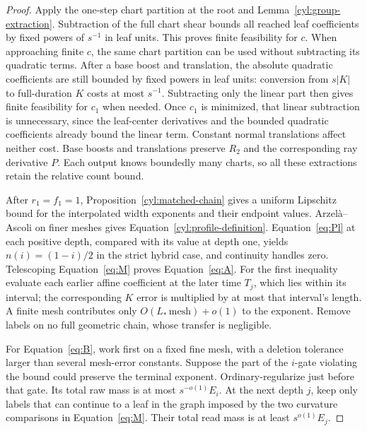 \begin{proof}
Apply the one-step chart partition at the root and
Lemma~\ref{cyl:group-extraction}.  Subtraction of the full chart shear
bounds all reached leaf coefficients by fixed powers of $s^{-1}$ in
leaf units.  This proves finite feasibility for $c$.
When approaching finite $c$, the same chart partition can be used
without subtracting its quadratic terms.  After a base boost and
translation, the absolute quadratic coefficients are still bounded by
fixed powers in leaf units: conversion from $s|K|$ to full-duration $K$
costs at most $s^{-1}$.  Subtracting only the linear part then gives
finite feasibility for $c_1$ when needed.  Once $c_1$ is minimized, that
linear subtraction is unnecessary, since the leaf-center derivatives
and the bounded quadratic coefficients already bound the linear term.
Constant normal translations affect neither cost.  Base boosts and
translations preserve $R_2$ and the corresponding ray derivative $P$.
Each output knows boundedly many charts, so all these extractions retain
the relative count bound.

After $r_1=f_1=1$, Proposition~\ref{cyl:matched-chain} gives a uniform
Lipschitz bound for the interpolated width exponents and their endpoint
values.  Arzel\`a--Ascoli on finer meshes gives
Equation~\eqref{cyl:profile-definition}.  Equation~\eqref{eq:Pl}
at each positive depth, compared with its value at depth one, yields
$n(i)=(1-i)/2$ in the strict hybrid case, and continuity handles zero.
Telescoping Equation~\eqref{eq:M} proves Equation~\eqref{eq:A}.
For the first inequality evaluate each earlier affine coefficient at
the later time $T_j$, which lies within its interval; the corresponding
$K$ error is multiplied by at most that interval's length.  A finite
mesh contributes only $O(L_*\,\mathrm{mesh})+o(1)$ to the exponent.
Remove labels on no full geometric chain, whose transfer is negligible.

For Equation~\eqref{eq:B}, work first on a fixed fine mesh, with a
deletion tolerance larger than several mesh-error constants.  Suppose
the part of the $i$-gate violating the bound could preserve the terminal
exponent.  Ordinary-regularize just before that gate.  Its total raw
mass is at most $s^{-o(1)}E_i$.  At the next depth $j$, keep only labels
that can continue to a leaf in the graph imposed by the two curvature
comparisons in Equation~\eqref{eq:M}.  Their total read mass is at least
$s^{o(1)}E_j$.


\end{proof}
